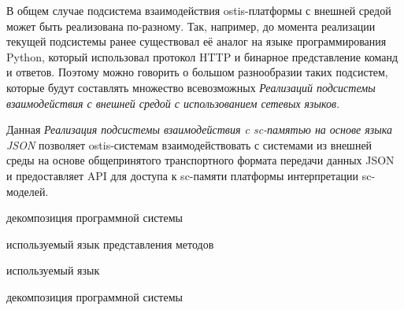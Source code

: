 \bigskip

В общем случае подсистема взаимодействия ostis-платформы с внешней средой может быть реализована по-разному. Так, например, до момента реализации текущей подсистемы ранее существовал её аналог на языке программирования Python, который использовал протокол HTTP и бинарное представление команд и ответов.
Поэтому можно говорить о большом разнообразии таких подсистем, которые будут составлять множество всевозможных \textit{Реализаций подсистемы взаимодействия с внешней средой с использованием сетевых языков}.

Данная \textit{Реализация подсистемы взаимодействия c sc-памятью на основе языка JSON} позволяет ostis-системам взаимодействовать с системами из внешней среды на основе общепринятого транспортного формата передачи данных JSON и предоставляет API для доступа к sc-памяти платформы интерпретации sc-моделей.

\begin{SCn}
\begin{scnrelfromset}{декомпозиция программной системы}
\end{scnrelfromset}
\end{SCn}

\begin{SCn}
\begin{scnrelfromlist}{используемый язык представления методов}
\end{scnrelfromlist}
\begin{scnrelfromlist}{используемый язык}
\end{scnrelfromlist}
\begin{scnrelfromset}{декомпозиция программной системы}
    \scnnonamednode
    \begin{scneqtoset}
    \end{scneqtoset}
\end{scnrelfromset}
\end{SCn}

